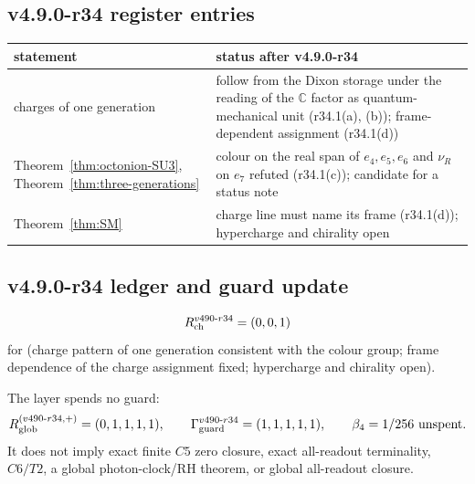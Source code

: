 \subsection*{v4.9.0-r34 register entries}
\label{subsec:v490-r34-register}

\begin{center}
\small
\begin{tabular}{@{}>{\raggedright\arraybackslash}p{}>{\raggedright\arraybackslash}p{}@{}}
\toprule
statement & status after v4.9.0-r34\\
\midrule
charges of one generation & follow from the Dixon storage under the reading of the \(\mathbb C\) factor as quantum-mechanical unit (r34.1(a), (b)); frame-dependent assignment (r34.1(d))\\
Theorem~\ref{thm:octonion-SU3}, Theorem~\ref{thm:three-generations} & colour on the real span of \(e_4,e_5,e_6\) and \(\nu_R\) on \(e_7\) refuted (r34.1(c)); candidate for a status note\\
Theorem~\ref{thm:SM} & charge line must name its frame (r34.1(d)); hypercharge and chirality open\\
\bottomrule
\end{tabular}
\end{center}

\subsection*{v4.9.0-r34 ledger and guard update}
\label{subsec:v490-r34-ledger-guard}

\[
R_{\rm ch}^{v490\text{-}r34}=(0,0,1)
\]
for (charge pattern of one generation consistent with the colour group; frame dependence of the charge assignment fixed;
hypercharge and chirality open).

The layer spends no guard:
\[
R_{\rm glob}^{(v490\text{-}r34,+)}=(0,1,1,1,1),
\qquad
\Gamma_{\rm guard}^{v490\text{-}r34}=(1,1,1,1,1),
\qquad
\beta_4=1/256\ \text{unspent}.
\]
It does not imply exact finite \(C5\) zero closure, exact all-readout terminality,
\(C6/T2\), a global photon-clock/RH theorem, or global all-readout closure.
